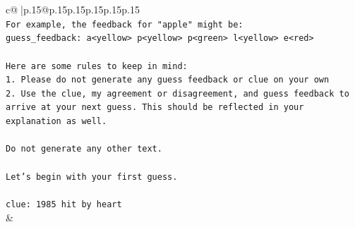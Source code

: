 \documentclass{article}
\begin{document}
{\begin{supertabular}{c@{$\;$}|p{.15\linewidth}@{}p{.15\linewidth}p{.15\linewidth}p{.15\linewidth}p{.15\linewidth}p{.15\linewidth}}
{{{\\ 
\texttt{For example, the feedback for "apple" might be:} \\
\texttt{guess\_feedback: a<yellow> p<yellow> p<green> l<yellow> e<red>} \\
\\ 
\texttt{Here are some rules to keep in mind:} \\
\texttt{1. Please do not generate any guess feedback or clue on your own} \\
\texttt{2. Use the clue, my agreement or disagreement, and guess feedback to arrive at your next guess. This should be reflected in your explanation as well.} \\
\\ 
\texttt{Do not generate any other text.} \\
\\ 
\texttt{Let's begin with your first guess.} \\
\\ 
\texttt{clue: 1985 hit by heart} \\
            }
        }
    }
    & \\ \\


\end{supertabular}}
\end{document}
